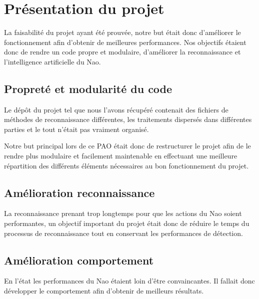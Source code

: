 \section{Présentation du projet}
\label{sec:Présentation du projet}

\par La faisabilité du projet ayant été prouvée, notre but était donc d'améliorer le fonctionnement afin d'obtenir de meilleures performances. Nos objectifs étaient donc de rendre un code propre et modulaire, d'améliorer la reconnaissance et l'intelligence artificielle du Nao.

\subsection{Propreté et modularité du code}
\par Le dépôt du projet tel que nous l'avons récupéré contenait des fichiers  de méthodes de reconnaissance différentes, les traitements dispersés dans différentes parties et le tout n'était pas vraiment organisé.

\par Notre but principal lors de ce PAO était donc de restructurer le projet afin de le rendre plus modulaire et facilement maintenable en effectuant une meilleure répartition des différents éléments nécessaires au bon fonctionnement du projet.
    
\subsection{Amélioration reconnaissance}
\par La reconnaissance prenant trop longtemps pour que les actions du Nao soient performantes, un objectif important du projet était donc de réduire le temps du processus de reconnaissance tout en conservant les performances de détection.

\subsection{Amélioration comportement}
\par En l'état les performances du Nao étaient loin d'être convaincantes. Il fallait donc développer le comportement afin d'obtenir de meilleurs résultats.
\pagebreak
